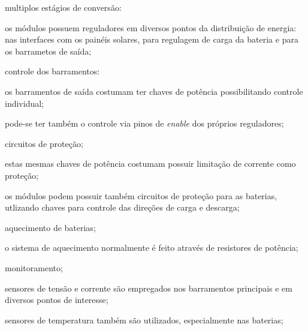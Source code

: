 \begin{alineas}
    \item multiplos estágios de conversão:
    \begin{alineas}
        \item os módulos possuem reguladores em diversos pontos da distribuição de energia: nas interfaces com os painéis solares, para regulagem de carga da bateria e para os barrametos de saída;
    \end{alineas}

    \item controle dos barramentos:
    \begin{alineas}
        \item os barramentos de saída costumam ter chaves de potência possibilitando controle individual;
        \item pode-se ter também o controle via pinos de \textit{enable} dos próprios reguladores;
    \end{alineas}

    \item circuitos de proteção;
    \begin{alineas}
        \item estas mesmas chaves de potência costumam possuir limitação de corrente como proteção;
        \item os módulos podem possuir também circuitos de proteção para as baterias, utlizando chaves para controle das direções de carga e descarga;
    \end{alineas}

    \item aquecimento de baterias;
    \begin{alineas}
        \item o sistema de aquecimento normalmente é feito através de resistores de potência;
    \end{alineas}
    
    \item monitoramento;
    \begin{alineas}
        \item sensores de tensão e corrente são empregados nos barramentos principais e em diversos pontos de interesse;
        \item sensores de temperatura também são utilizados, especialmente nas baterias;
    \end{alineas}


\end{alineas}
